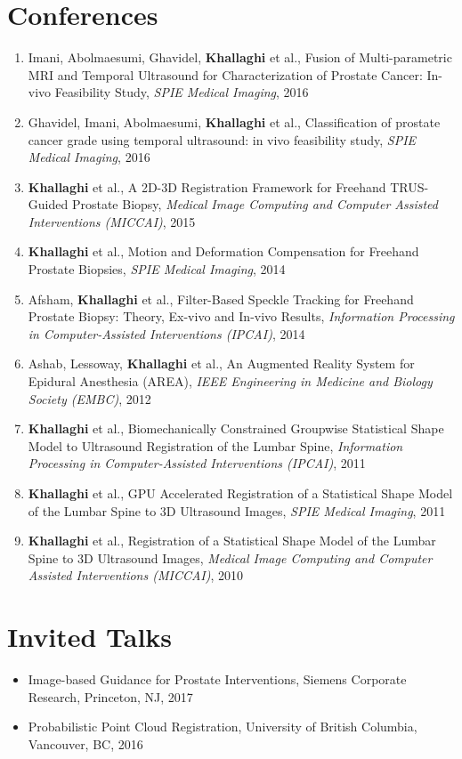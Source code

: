 \documentclass[letterpaper,11pt]{article}
\newcommand{\reviewItem}[1]{
  \item\small{#1 \vspace{-2pt}}
}
\newcommand{\publicationItem}[4]{
  \item\small{
    {#1}{ et al., #2}{, \textit{#3}}{, #4}
  }
}
\newcommand{\publicationSubheadingListStart}{\begin{enumerate}[leftmargin=*]}
\newcommand{\publicationSubheadingListEnd}{\end{enumerate}}
\newcommand{\publicationSubItem}[4]{\publicationItem{#1}{#2}{#3}{#4}\vspace{-4pt}}
\newcommand{\resumeSubHeadingListStart}{\begin{itemize}[leftmargin=*]}
\newcommand{\resumeSubHeadingListEnd}{\end{itemize}}
\begin{document}
\section{Conferences}
  \publicationSubheadingListStart
    \publicationSubItem{Imani, Abolmaesumi, Ghavidel, \textbf{Khallaghi}}
      {Fusion of Multi-parametric MRI and Temporal Ultrasound for Characterization of Prostate Cancer: In-vivo Feasibility Study}
      {SPIE Medical Imaging}{2016}
    \publicationSubItem{Ghavidel, Imani, Abolmaesumi, \textbf{Khallaghi}}
      {Classification of prostate cancer grade using temporal ultrasound: in vivo feasibility study}
      {SPIE Medical Imaging}{2016}
    \publicationSubItem{\textbf{Khallaghi}}
      {A 2D-3D Registration Framework for Freehand TRUS-Guided Prostate Biopsy}
      {Medical Image Computing and Computer Assisted Interventions (MICCAI)}{2015}
    \publicationSubItem{\textbf{Khallaghi}}
      {Motion and Deformation Compensation for Freehand Prostate Biopsies}
      {SPIE Medical Imaging}{2014}
    \publicationSubItem{Afsham, \textbf{Khallaghi}}
      {Filter-Based Speckle Tracking for Freehand Prostate Biopsy: Theory, Ex-vivo and In-vivo Results}
      {Information Processing in Computer-Assisted Interventions (IPCAI)}{2014}
    \publicationSubItem{Ashab, Lessoway, \textbf{Khallaghi}}
      {An Augmented Reality System for Epidural Anesthesia (AREA)}
      {IEEE Engineering in Medicine and Biology Society (EMBC)}{2012}
    \publicationSubItem{\textbf{Khallaghi}}
      {Biomechanically Constrained Groupwise Statistical Shape Model to Ultrasound Registration of the Lumbar Spine}
      {Information Processing in Computer-Assisted Interventions (IPCAI)}{2011}
    \publicationSubItem{\textbf{Khallaghi}}
      {GPU Accelerated Registration of a Statistical Shape Model of the Lumbar Spine to 3D Ultrasound Images}
      {SPIE Medical Imaging}{2011}
    \publicationSubItem{\textbf{Khallaghi}}
      {Registration of a Statistical Shape Model of the Lumbar Spine to 3D Ultrasound Images}
      {Medical Image Computing and Computer Assisted Interventions (MICCAI)}{2010}
  \publicationSubheadingListEnd

\section{Invited Talks}
  \resumeSubHeadingListStart
    \reviewItem{Image-based Guidance for Prostate Interventions, Siemens Corporate Research, Princeton, NJ, 2017}
    \reviewItem{Probabilistic Point Cloud Registration, University of British Columbia, Vancouver, BC, 2016}
  \resumeSubHeadingListEnd
\end{document}
